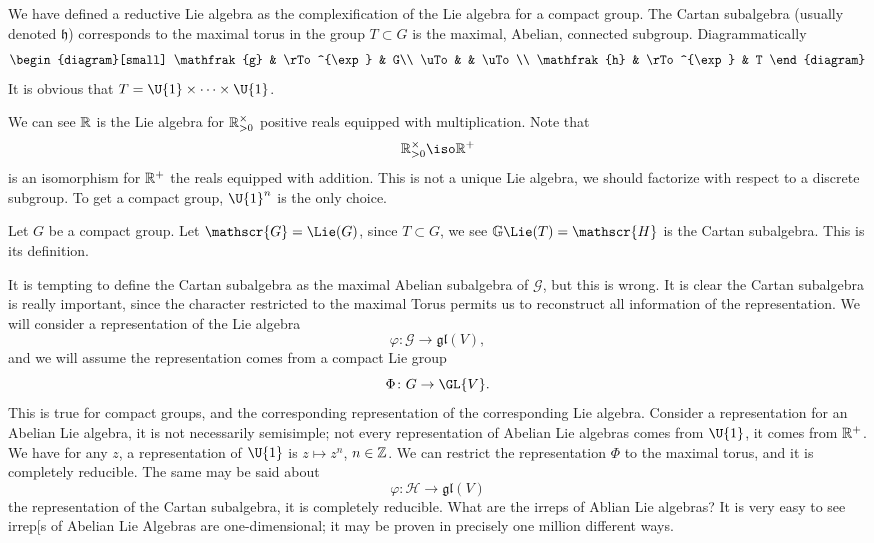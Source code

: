We have defined a reductive Lie algebra as the complexification
of the Lie algebra for a compact group. The Cartan subalgebra
(usually denoted $\mathfrak{h}$) corresponds to the maximal torus
in the group $T\subset G$ is the maximal, Abelian, connected
subgroup. Diagrammatically 
\begin{equation}
\begin{diagram}[small]
\mathfrak{g} & \rTo^{\exp} & G\\
\uTo         &             & \uTo\\
\mathfrak{h} & \rTo^{\exp} & T
\end{diagram}
\end{equation}
It is obvious that $T=\U{1}\times\cdots\times\U{1}$.

We can see $\Bbb{R}$ is the Lie algebra for
$\Bbb{R}^{\times}_{>0}$ positive reals equipped with
multiplication. Note that
\begin{equation}
\Bbb{R}^{\times}_{>0}\iso\Bbb{R}^{+}
\end{equation}
is an isomorphism for $\Bbb{R}^{+}$ the reals equipped with
addition. This is not a unique Lie algebra, we should factorize
with respect to a discrete subgroup. To get a compact group,
$\U{1}^{n}$ is the only choice.

Let $G$ be a compact group. Let $\mathscr{G}=\Lie(G)$, since
$T\subset G$, we see $\mathbb{G}\Lie(T)=\mathscr{H}$ is the
Cartan subalgebra. This is its definition.

It is tempting to define the Cartan subalgebra as the maximal
Abelian subalgebra of $\mathscr{G}$, but this is wrong. It is
clear the Cartan subalgebra is really important, since the
character restricted to the maximal Torus permits us to
reconstruct all information of the representation. We will
consider a representation of the Lie algebra
\begin{equation}
\varphi\colon\mathscr{G}\to\mathfrak{gl}(V),
\end{equation}
and we will assume the representation comes from a compact Lie
group
\begin{equation}
\Phi\colon G\to\GL{V}.
\end{equation}
This is true for compact groups, and the corresponding
representation of the corresponding Lie algebra. Consider a
representation for an Abelian Lie algebra, it is not necessarily
semisimple; not every representation of Abelian Lie algebras
comes from $\U{1}$, it comes from $\Bbb{R}^{+}$. We have for any
$z$, a representation of $\U{1}$ is $z\mapsto z^{n}$,
$n\in\Bbb{Z}$. We can restrict the representation $\Phi$ to the
maximal torus, and it is completely reducible. The same may be
said about
\begin{equation}
\varphi\colon\mathscr{H}\to\mathfrak{gl}(V)
\end{equation}
the representation of the Cartan subalgebra, it is completely
reducible. What are the irreps of Ablian Lie algebras? It is very
easy to see irrep[s of Abelian Lie Algebras are one-dimensional;
it may be proven in precisely one million different ways.

